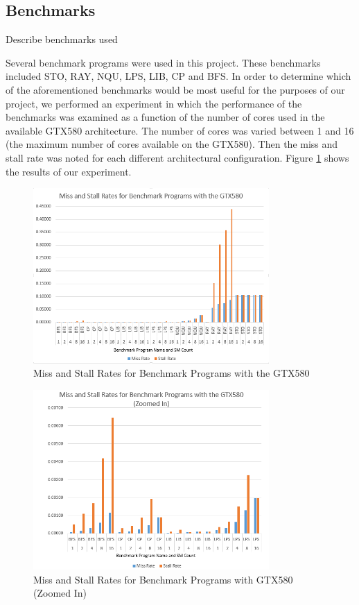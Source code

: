 \subsection{Benchmarks}
Describe benchmarks used 

Several benchmark programs were used in this project. 
These benchmarks included STO, RAY, NQU, LPS, LIB, CP and BFS. 
In order to determine which of the aforementioned benchmarks would be
most useful for the purposes of our project, we performed an
experiment in which the performance of the benchmarks was examined as
a function of the number of cores used in the available GTX580
architecture. 
The number of cores was varied between 1 and 16 (the maximum number of
cores available on the GTX580). 
Then the miss and stall rate was noted for each different
architectural configuration. 
Figure \ref{fig:missStalls} shows the results of our experiment. 

\begin{figure}[b!]
\centering
\includegraphics[width=90mm]{graphics/miss_stalls_benchmarks.png}
\caption{Miss and Stall Rates for Benchmark Programs with the GTX580
}
\label{fig:missStalls}
\end{figure}

\begin{figure}[b!]
\centering
\includegraphics[width=90mm]{graphics/miss_stalls_benchmarks_zoomed.png}
\caption{Miss and Stall Rates for Benchmark Programs with GTX580 (Zoomed In) }
\label{fig:missStallsZoomed}
\end{figure}

